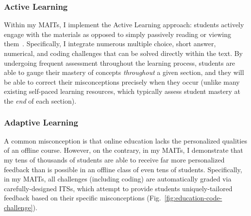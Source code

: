 \subsubsection{Active Learning}
Within my \glspl{MAIT}, I implement the Active Learning approach: students actively engage with the materials as opposed to simply passively reading or viewing them~\cite{Bonwell1991}. Specifically, I integrate numerous multiple choice, short answer, numerical, and coding challenges that can be solved directly within the text. By undergoing frequent assessment throughout the learning process, students are able to gauge their mastery of concepts \textit{throughout} a given section, and they will be able to correct their misconceptions precisely when they occur (unlike many existing self-paced learning resources, which typically assess student mastery at the \textit{end} of each section).

\subsubsection{Adaptive Learning}
A common misconception is that online education lacks the personalized qualities of an offline course. However, on the contrary, in my \glspl{MAIT}, I demonstrate that my tens of thousands of students are able to receive far more personalized feedback than is possible in an offline class of even tens of students. Specifically, in my \glspl{MAIT}, all challenges (including coding) are automatically graded via carefully-designed \glspl{ITS}, which attempt to provide students uniquely-tailored feedback based on their specific misconceptions (Fig.~\ref{fig:education-code-challenge}).

